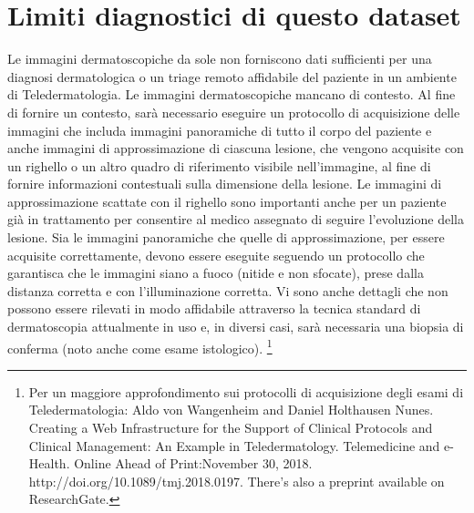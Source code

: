 {	\section{Limiti diagnostici di questo dataset}
	Le immagini dermatoscopiche da sole non forniscono dati sufficienti per una diagnosi dermatologica o un triage remoto affidabile del paziente in un ambiente di Teledermatologia.\cite{tschandl2018ham10000}
	\newline
	Le immagini dermatoscopiche mancano di contesto. Al fine di fornire un contesto, sarà necessario eseguire un protocollo di acquisizione delle immagini che includa immagini panoramiche di tutto il corpo del paziente e anche immagini di approssimazione di ciascuna lesione, che vengono acquisite con un righello o un altro quadro di riferimento visibile nell'immagine, al fine di fornire informazioni contestuali sulla dimensione della lesione. 
	\newline
	Le immagini di approssimazione scattate con il righello sono importanti anche per un paziente già in trattamento per consentire al medico assegnato di seguire l'evoluzione della lesione. Sia le immagini panoramiche che quelle di approssimazione, per essere acquisite correttamente, devono essere eseguite seguendo un protocollo che garantisca che le immagini siano a fuoco (nitide e non sfocate), prese dalla distanza corretta e con l'illuminazione corretta. \cite{von2019creating}
	Vi sono anche dettagli che non possono essere rilevati in modo affidabile attraverso la tecnica standard di dermatoscopia attualmente in uso e, in diversi casi, sarà necessaria una biopsia di conferma (noto anche come esame istologico).
	\footnote{Per un maggiore approfondimento sui protocolli di acquisizione degli esami di Teledermatologia: Aldo von Wangenheim and Daniel Holthausen Nunes. Creating a Web Infrastructure for the Support of Clinical Protocols and Clinical Management: An Example in Teledermatology. Telemedicine and e-Health. Online Ahead of Print:November 30, 2018. http://doi.org/10.1089/tmj.2018.0197. There’s also a preprint available on ResearchGate.}
	
}
